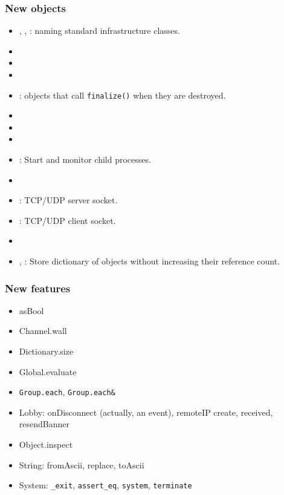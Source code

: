 \subsubsection{New objects}
\begin{itemize}
\item {}, , :
  naming standard infrastructure classes.
\item {}
\item {}
\item {}
\item {}: objects that call
  \lstinline|finalize()| when they are destroyed.
\item {}
\item {}
\item {}
\item {}: Start and monitor child processes.
\item {}
\item {}: TCP/UDP server socket.
\item {}: TCP/UDP client socket.
\item {}
\item {}, : Store
  dictionary of objects without increasing their reference count.
\end{itemize}

\subsubsection{New features}
\begin{itemize}
\item asBool
\item Channel.wall
\item Dictionary.size
\item Global.evaluate
\item \lstinline|Group.each|, \lstinline|Group.each&|
\item Lobby: onDisconnect (actually, an event), remoteIP
  create, received, resendBanner
\item Object.inspect
\item String: fromAscii, replace, toAscii
\item System: \lstinline|_exit|, \lstinline|assert_eq|,
  \lstinline|system|, \lstinline|terminate|
\end{itemize}

